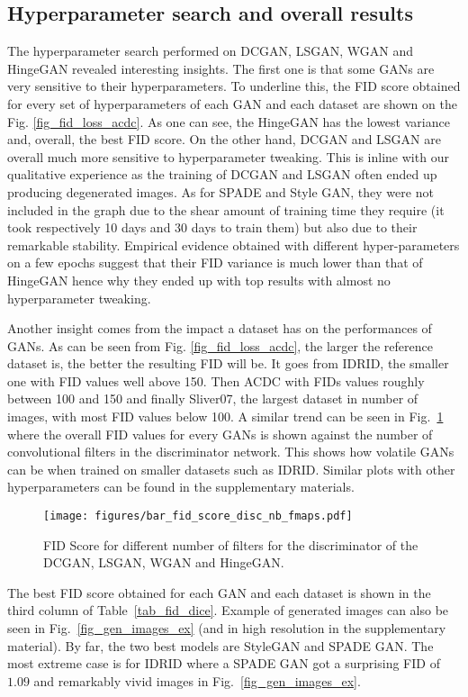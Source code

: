 \documentclass[preprint,12pt, authoryear]{elsarticle}
\begin{document}
\subsection{Hyperparameter search and overall results}

The hyperparameter search performed on DCGAN, LSGAN, WGAN and HingeGAN revealed interesting insights.  The first one is that some GANs are very sensitive to their hyperparameters.  To underline this, the FID score obtained for every set of hyperparameters of each GAN and each dataset are shown on the Fig. \ref{fig_fid_loss_acdc}.  As one can see, the HingeGAN has the lowest variance and, overall, the best FID score.  On the other hand, DCGAN and LSGAN are overall much more sensitive to hyperparameter tweaking.  This is inline with our qualitative experience as the training of DCGAN and LSGAN often ended up producing degenerated images.   As for SPADE and Style GAN, they were not included in the graph due to the shear amount of training time they require (it took respectively 10 days and 30 days to train them) but also due to their remarkable stability.  Empirical evidence obtained with different hyper-parameters on a few epochs  suggest that their FID variance is much lower than that of HingeGAN hence why they ended up with top results with almost no hyperparameter tweaking.

Another insight comes from the impact a dataset has on the performances of GANs.  As can be seen from Fig. \ref{fig_fid_loss_acdc}, the larger the reference dataset is, the better the resulting FID will be.  It goes from IDRID, the smaller one with FID values well above 150.  Then ACDC with FIDs values roughly between 100 and 150 and finally Sliver07, the largest dataset in number of images, with most FID values below 100.  A similar trend can be seen in Fig.~\ref{fid_hparams} where the overall FID values for every GANs is shown against the number of convolutional filters in the discriminator network.  This shows how volatile GANs can be when trained on smaller datasets such as IDRID.  Similar plots with other hyperparameters can be found in the supplementary materials.

\begin{figure}[tp]
\centering
\texttt{[image: figures/bar\_fid\_score\_disc\_nb\_fmaps.pdf]}
\caption{\small FID Score for different number of filters for the discriminator of the DCGAN, LSGAN, WGAN and HingeGAN.}
\label{fid_hparams}
\end{figure}

The best FID score obtained for each GAN and each dataset is shown in  the third column of Table~\ref{tab_fid_dice}.  Example of generated images can also be seen in Fig.~\ref{fig_gen_images_ex} (and in high resolution in the supplementary material).  By far, the two best models are StyleGAN and SPADE GAN.   The most extreme case is for IDRID where a SPADE GAN got a surprising FID of $1.09$ and remarkably vivid images in  Fig.~\ref{fig_gen_images_ex}.  
 
\end{document}
